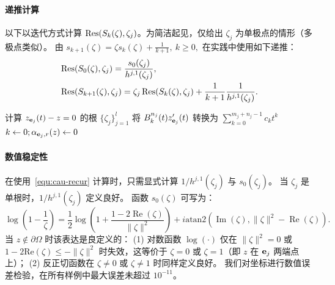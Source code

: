 \paragraph{递推计算}\label{sec:cau-encoding}
以下以迭代方式计算 \(\mathop{\mathrm{Res}}(S_{k}(\zeta),\zeta_j)\)。为简洁起见，仅给出 \(\zeta_j\) 为单极点的情形（多极点类似）。
由
    $s_{k+1}(\zeta)=\zeta s_k(\zeta)+\frac{1}{k+1},\ k\geq 0,$
在实践中使用如下递推：
\begin{equation}\label{equ:cau-recur}
\begin{aligned}
&\mathop{\mathrm{Res}}(S_{0}(\zeta),\zeta_j)=\frac{s_0(\zeta_j)}{h^{j,1}(\zeta_j)},\\
    &\mathop{\mathrm{Res}}(S_{k+1}(\zeta),\zeta_j)=\zeta_j \mathop{\mathrm{Res}}(S_k(\zeta),\zeta_j)+\frac{1}{k+1}\frac{1}{h^{j,1}(\zeta_j)}.
    \end{aligned}
\end{equation}

\begin{algorithm}[t]
  \caption{计算初始位置点 $z$ 的 Cauchy 坐标}\label{alg:cau-encoding}


  计算 $z_{\mathbf{e}_j}(t)-z=0$ 的根 $\{\zeta_j\}_{j=1}^l$\;
  将 \(B_k^{n_j}(t)z_{\mathbf{e}_j}'(t)\) 转换为 \(\sum_{k=0}^{m_j+n_j-1} c_k t^k\)\;
  $k \gets 0; \alpha_{\mathbf{e}_j,r}(z) \gets 0$\;
\end{algorithm}

\paragraph{数值稳定性}
在使用~\eqref{equ:cau-recur} 计算时，只需显式计算 $1/h^{j,1}(\zeta_j)$ 与 $s_0(\zeta_j)$。
当 \(\zeta_j\) 是单根时，$1/h^{j,1}(\zeta_j)$ 定义良好。
函数 \( s_0(\zeta) \) 可写为：
{\small
\[
\log(1-\frac{1}{\zeta}) = \frac{1}{2} \log\left(1+\frac{ 1 - 2 \operatorname{Re}(\zeta)}{\|\zeta\|^2}\right) + i \text{atan2}\left(\operatorname{Im}(\zeta), \|\zeta\|^2 - \operatorname{Re}(\zeta)\right).
\]
}
当 \( z \notin \partial \Omega \) 时该表达是良定义的：
(1) 对数函数 \( \log(\cdot) \) 仅在 \( \|\zeta\|^2 = 0 \) 或 \( 1 - 2 \text{Re}(\zeta) \leq -\|\zeta\|^2 \) 时失效，这等价于 \( \zeta = 0 \) 或 \( \zeta = 1 \)（即 \( z \) 在 $\mathbf{e}_j$ 两端点上）；
(2) 反正切函数在 \( \zeta \neq 0 \) 或 \( \zeta \neq 1 \) 时同样定义良好。
我们对坐标进行数值误差检验，在所有样例中最大误差未超过 $10^{-11}$。
